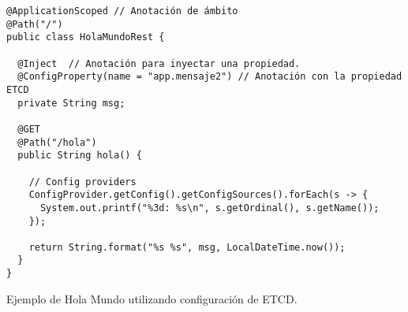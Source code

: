 \documentclass[11pt]{scrartcl} %
\begin{document}
\begin{listing}[H]
	\begin{verbatim}
@ApplicationScoped // Anotación de ámbito
@Path("/")
public class HolaMundoRest {

  @Inject  // Anotación para inyectar una propiedad.
  @ConfigProperty(name = "app.mensaje2") // Anotación con la propiedad ETCD
  private String msg;

  @GET
  @Path("/hola")
  public String hola() {

    // Config providers
    ConfigProvider.getConfig().getConfigSources().forEach(s -> {
      System.out.printf("%3d: %s\n", s.getOrdinal(), s.getName());
    });

    return String.format("%s %s", msg, LocalDateTime.now());
  }
}
	\end{verbatim}
	\caption{Ejemplo de Hola Mundo utilizando configuración de ETCD.}
	\label{lst:java}
\end{listing}
\end{document}
